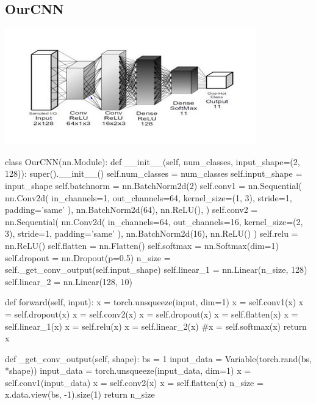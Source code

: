 \documentclass[12pt,a4paper]{article}
\begin{document}
    \subsection{OurCNN}
         \begin{center}
         \includegraphics{imgs/cnn.png}
        \end{center}
        \begin{python}
class OurCNN(nn.Module):
    def __init__(self, num_classes, input_shape=(2, 128)):
        super().__init__()
        self.num_classes = num_classes
        self.input_shape = input_shape
        self.batchnorm = nn.BatchNorm2d(2)
        self.conv1 = nn.Sequential(
            nn.Conv2d(
                in_channels=1,
                out_channels=64,
                kernel_size=(1, 3),
                stride=1,
                padding='same'
            ),
            nn.BatchNorm2d(64),
            nn.ReLU(),
        )
        self.conv2 = nn.Sequential(
            nn.Conv2d(
                in_channels=64,
                out_channels=16,
                kernel_size=(2, 3),
                stride=1,
                padding='same'
            ),
            nn.BatchNorm2d(16),
            nn.ReLU()
        )
        self.relu = nn.ReLU()
        self.flatten = nn.Flatten()
        self.softmax = nn.Softmax(dim=1)
        self.dropout = nn.Dropout(p=0.5)
        n_size = self._get_conv_output(self.input_shape)
        self.linear_1 = nn.Linear(n_size, 128)
        self.linear_2 = nn.Linear(128, 10)

    def forward(self, input):
        x = torch.unsqueeze(input, dim=1)
        x = self.conv1(x)
        x = self.dropout(x)
        x = self.conv2(x)
        x = self.dropout(x)
        x = self.flatten(x)
        x = self.linear_1(x)
        x = self.relu(x)
        x = self.linear_2(x)
        #x = self.softmax(x)
        return x

    def _get_conv_output(self, shape):
        bs = 1
        input_data = Variable(torch.rand(bs, *shape))
        input_data = torch.unsqueeze(input_data, dim=1)
        x = self.conv1(input_data)
        x = self.conv2(x)
        x = self.flatten(x)
        n_size = x.data.view(bs, -1).size(1)
        return n_size
\end{python}
    \newpage
    
\end{document}
